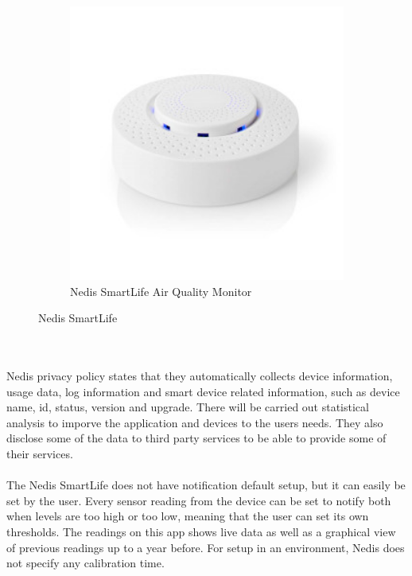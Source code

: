 \begin{figure} [!ht]
\begin{subfigure}{0.3\textwidth}
         \includegraphics[width=1.5\textwidth]{figures/NedisDevice.jpg}
         \caption{Nedis SmartLife Air Quality Monitor \cite{Nedis}}
         \label{fig:NedisDev}
     \end{subfigure}
     \hfill
        \caption{Nedis SmartLife}
        \label{fig:NedisBoth}
\end{figure}
\\\\
Nedis privacy policy states that they automatically collects device information, usage data, log information and smart device related information, such as device name, id, status, version and upgrade. There will be carried out statistical analysis to imporve the application and devices to the users needs. They also disclose some of the data to third party services to be able to provide some of their services. 
\\\\
The Nedis SmartLife does not have notification default setup, but it can easily be set by the user. Every sensor reading from the device can be set to notify both when levels are too high or too low, meaning that the user can set its own thresholds. The readings on this app shows live data as well as a graphical view of previous readings up to a year before. For setup in an environment, Nedis does not specify any calibration time.  


